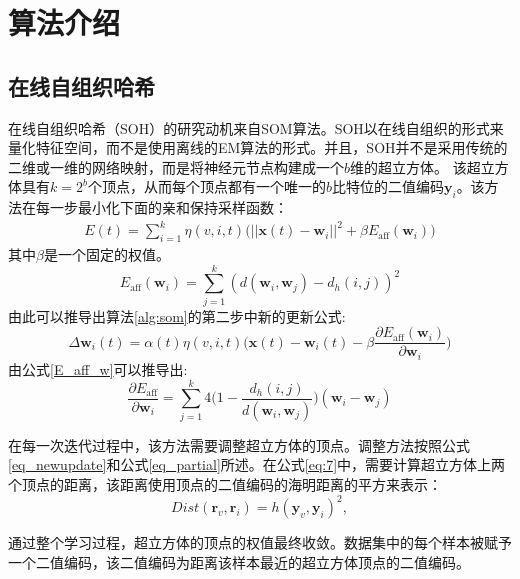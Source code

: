 \section{算法介绍}
\subsection{在线自组织哈希}
在线自组织哈希（SOH）的研究动机来自SOM算法。SOH以在线自组织的形式来量化特征空间，而不是使用离线的EM算法的形式。并且，SOH并不是采用传统的二维或一维的网络映射，而是将神经元节点构建成一个$b$维的超立方体。 该超立方体具有$k=2^{b}$个顶点，从而每个顶点都有一个唯一的$b$比特位的二值编码$\mathbf{y}_{i}$。该方法在每一步最小化下面的亲和保持采样函数：
\begin{equation}\label{objective_soh}
\begin{split}
E(t) = \sum_{i=1}^{k} \eta(v, i, t) \big( ||\mathbf{x}(t) - \mathbf{w}_{i}||^{2} + \beta  E_{\mathrm{aff}}(\mathbf{w}_{i})\big)
\end{split}
\end{equation}
其中$\beta$是一个固定的权值。
\begin{equation}\label{E_aff_w}
E_{\mathrm{aff}}(\mathbf{w}_{i}) =  \sum_{j=1}^{k}(d(\mathbf{w}_{i}, \mathbf{w}_{j}) - d_{h}(i, j))^{2}
\end{equation}
由此可以推导出算法\ref{alg:som}的第二步中新的更新公式:
\begin{equation}\label{eq_newupdate}
\Delta\mathbf{w}_{i}(t) =   \alpha(t)\eta(v, i, t)\big(\mathbf{x}(t) - \mathbf{w}_{i}(t) -  \beta \frac{\partial E_{\mathrm{aff}}(\mathbf{w}_{i})}{\partial \mathbf{w}_{i}}\big)
\end{equation}
由公式\ref{E_aff_w}可以推导出:
\begin{equation}\label{eq_partial}
\frac{\partial E_{\mathrm{aff}}}{\partial \mathbf{w}_{i}} = \sum_{j=1}^{k}4 \Big(1 - \frac{d_{h}(i, j)}{d(\mathbf{w}_{i}, \mathbf{w}_{j})} \Big)(\mathbf{w}_{i} - \mathbf{w}_{j})
\end{equation}

在每一次迭代过程中，该方法需要调整超立方体的顶点。调整方法按照公式\ref{eq_newupdate}和公式\ref{eq_partial}所述。在公式\ref{eq:7}中，需要计算超立方体上两个顶点的距离，该距离使用顶点的二值编码的海明距离的平方来表示：
\begin{equation}\label{10}
Dist(\mathbf{r}_{v} , \mathbf{r}_{i}) = h(\mathbf{y}_{v}, \mathbf{y}_{i})^2,
\end{equation}

通过整个学习过程，超立方体的顶点的权值最终收敛。数据集中的每个样本被赋予一个二值编码，该二值编码为距离该样本最近的超立方体顶点的二值编码。

